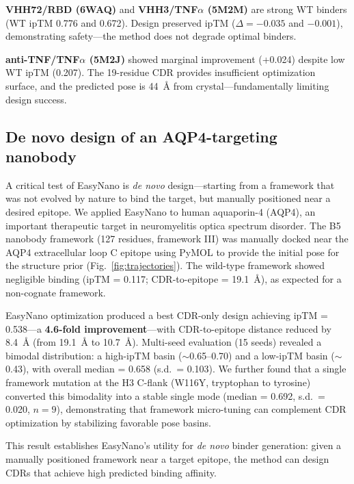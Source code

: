 \documentclass[11pt,a4paper]{article}
\begin{document}
\textbf{VHH72/RBD (6WAQ)} and \textbf{VHH3/TNF$\alpha$ (5M2M)} are strong WT binders (WT ipTM \num{0.776} and \num{0.672}). Design preserved ipTM ($\Delta = -0.035$ and $-0.001$), demonstrating safety---the method does not degrade optimal binders.

\textbf{anti-TNF/TNF$\alpha$ (5M2J)} showed marginal improvement (+0.024) despite low WT ipTM (\num{0.207}). The 19-residue CDR provides insufficient optimization surface, and the predicted pose is \SI{44}{\AA} from crystal---fundamentally limiting design success.

\subsection{De novo design of an AQP4-targeting nanobody}

A critical test of EasyNano is \textit{de novo} design---starting from a framework that was not evolved by nature to bind the target, but manually positioned near a desired epitope. We applied EasyNano to human aquaporin-4 (AQP4), an important therapeutic target in neuromyelitis optica spectrum disorder. The B5 nanobody framework (127 residues, framework III) was manually docked near the AQP4 extracellular loop C epitope using PyMOL to provide the initial pose for the structure prior (Fig.\ \ref{fig:trajectories}). The wild-type framework showed negligible binding (ipTM = \num{0.117}; CDR-to-epitope = \SI{19.1}{\AA}), as expected for a non-cognate framework.

EasyNano optimization produced a best CDR-only design achieving ipTM = \num{0.538}---a \textbf{4.6-fold improvement}---with CDR-to-epitope distance reduced by \SI{8.4}{\AA} (from \SI{19.1}{\AA} to \SI{10.7}{\AA}). Multi-seed evaluation (15 seeds) revealed a bimodal distribution: a high-ipTM basin ($\sim$0.65--0.70) and a low-ipTM basin ($\sim$0.43), with overall median = \num{0.658} (s.d.\ = \num{0.103}). We further found that a single framework mutation at the H3 C-flank (W116Y, tryptophan to tyrosine) converted this bimodality into a stable single mode (median = \num{0.692}, s.d.\ = \num{0.020}, $n=9$), demonstrating that framework micro-tuning can complement CDR optimization by stabilizing favorable pose basins.

This result establishes EasyNano's utility for \textit{de novo} binder generation: given a manually positioned framework near a target epitope, the method can design CDRs that achieve high predicted binding affinity.
\end{document}
